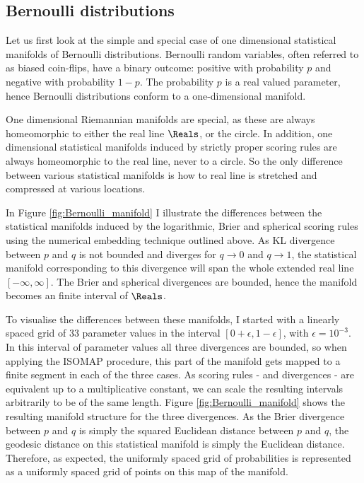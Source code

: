 \subsection{Bernoulli distributions}

Let us first look at the simple and special case of one dimensional statistical manifolds of Bernoulli distributions. Bernoulli random variables, often referred to as biased coin-flips, have a binary outcome: positive with probability $p$ and negative with probability $1-p$. The probability $p$ is a real valued parameter, hence Bernoulli distributions conform to a one-dimensional manifold.

One dimensional Riemannian manifolds are special, as these are always homeomorphic to either the real line $\Reals$, or the circle. In addition, one dimensional statistical manifolds induced by strictly proper scoring rules are always homeomorphic to the real line, never to a circle. So the only difference between various statistical manifolds is how to real line is stretched and compressed at various locations.

In Figure \ref{fig:Bernoulli_manifold} I illustrate the differences between the statistical manifolds induced by the logarithmic, Brier and spherical scoring rules using the numerical embedding technique outlined above. As KL divergence between $p$ and $q$ is not bounded and diverges for $q\rightarrow 0$ and $q\rightarrow 1$, the statistical manifold corresponding to this divergence will span the whole extended real line $[-\infty,\infty]$. The Brier and spherical divergences are bounded, hence the manifold becomes an finite interval of $\Reals$.

To visualise the differences between these manifolds, I started with a linearly spaced grid of $33$ parameter values in the interval $[0+\epsilon,1-\epsilon]$, with $\epsilon = 10^{-3}$. In this interval of parameter values all three divergences are bounded, so when applying the ISOMAP procedure, this part of the manifold gets mapped to a finite segment in each of the three cases. As scoring rules - and divergences - are equivalent up to a multiplicative constant, we can scale the resulting intervals arbitrarily to be of the same length. Figure \ref{fig:Bernoulli_manifold} shows the resulting manifold structure for the three divergences. As the Brier divergence between $p$ and $q$ is simply the squared Euclidean distance between $p$ and $q$, the geodesic distance on this statistical manifold is simply the Euclidean distance. Therefore, as expected, the uniformly spaced grid of probabilities is represented as a uniformly spaced grid of points on this map of the manifold.

